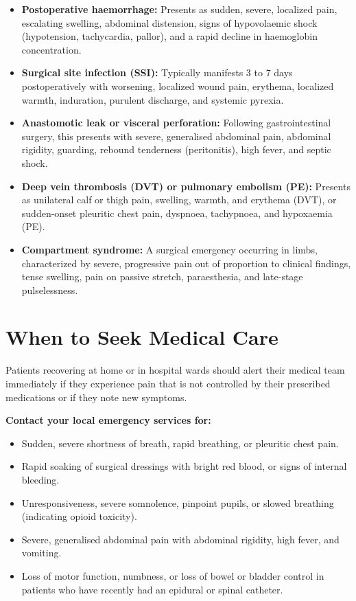 \begin{itemize}
    \item \textbf{Postoperative haemorrhage:} Presents as sudden, severe, localized pain, escalating swelling, abdominal distension, signs of hypovolaemic shock (hypotension, tachycardia, pallor), and a rapid decline in haemoglobin concentration.
    \item \textbf{Surgical site infection (SSI):} Typically manifests 3 to 7 days postoperatively with worsening, localized wound pain, erythema, localized warmth, induration, purulent discharge, and systemic pyrexia.
    \item \textbf{Anastomotic leak or visceral perforation:} Following gastrointestinal surgery, this presents with severe, generalised abdominal pain, abdominal rigidity, guarding, rebound tenderness (peritonitis), high fever, and septic shock.
    \item \textbf{Deep vein thrombosis (DVT) or pulmonary embolism (PE):} Presents as unilateral calf or thigh pain, swelling, warmth, and erythema (DVT), or sudden-onset pleuritic chest pain, dyspnoea, tachypnoea, and hypoxaemia (PE).
    \item \textbf{Compartment syndrome:} A surgical emergency occurring in limbs, characterized by severe, progressive pain out of proportion to clinical findings, tense swelling, pain on passive stretch, paraesthesia, and late-stage pulselessness.
\end{itemize}

\section*{When to Seek Medical Care}
Patients recovering at home or in hospital wards should alert their medical team immediately if they experience pain that is not controlled by their prescribed medications or if they note new symptoms.

\textbf{Contact your local emergency services for:}
\begin{itemize}
    \item Sudden, severe shortness of breath, rapid breathing, or pleuritic chest pain.
    \item Rapid soaking of surgical dressings with bright red blood, or signs of internal bleeding.
    \item Unresponsiveness, severe somnolence, pinpoint pupils, or slowed breathing (indicating opioid toxicity).
    \item Severe, generalised abdominal pain with abdominal rigidity, high fever, and vomiting.
    \item Loss of motor function, numbness, or loss of bowel or bladder control in patients who have recently had an epidural or spinal catheter.
\end{itemize}

